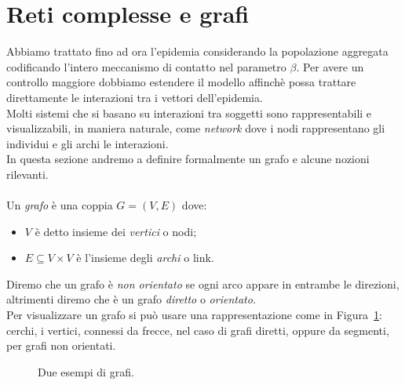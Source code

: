 \section{Reti complesse e grafi}\label{grafi}
Abbiamo trattato fino ad ora l'epidemia considerando la popolazione aggregata codificando l'intero meccanismo di contatto nel parametro $\beta$. Per avere un controllo maggiore dobbiamo estendere il modello affinch\`e possa trattare direttamente le interazioni tra i vettori dell'epidemia.\\
Molti sistemi che si basano su interazioni tra soggetti sono rappresentabili e visualizzabili, in maniera naturale, come \textit{network} dove i nodi rappresentano gli individui e gli archi le interazioni.\\
In questa sezione andremo a definire formalmente un grafo e alcune nozioni rilevanti.\\ \\
Un \textit{grafo} \`e una coppia $G=(V,	E) $ dove:
\begin{itemize}
	\item $V$ \`e detto  insieme dei \textit{vertici} o nodi;
	\item $E\subseteq V \times V$ \`e l'insieme degli \textit{archi} o link.
\end{itemize}
Diremo che un grafo \`e \textit{non orientato} se ogni arco appare in entrambe le direzioni, altrimenti diremo che \`e un grafo \textit{diretto} o \textit{orientato}.\\
Per visualizzare un grafo si pu\`o usare una rappresentazione come in Figura~\ref{fig::esegrafi}: cerchi, i vertici, connessi da frecce, nel caso di grafi diretti, oppure da segmenti, per grafi non orientati. 
\begin{figure}[ht]
\centering
{}  \hfill
{}
\caption{Due esempi di grafi.}
\label{fig::esegrafi}
\end{figure}

